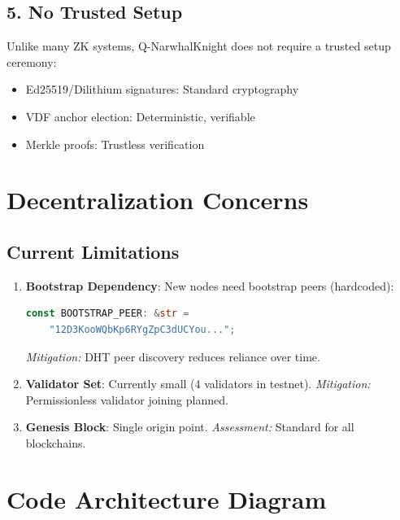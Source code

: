 \documentclass[a5paper,11pt]{article}
\begin{document}
\subsection{5. No Trusted Setup}

Unlike many ZK systems, Q-NarwhalKnight does not require a trusted setup ceremony:

\begin{itemize}
    \item Ed25519/Dilithium signatures: Standard cryptography
    \item VDF anchor election: Deterministic, verifiable
    \item Merkle proofs: Trustless verification
\end{itemize}

\section{Decentralization Concerns}

\subsection{Current Limitations}

\begin{enumerate}
    \item \textbf{Bootstrap Dependency}: New nodes need bootstrap peers (hardcoded):
    \begin{lstlisting}[language=Rust]
const BOOTSTRAP_PEER: &str =
    "12D3KooWQbKp6RYgZpC3dUCYou...";
    \end{lstlisting}
    \textit{Mitigation:} DHT peer discovery reduces reliance over time.

    \item \textbf{Validator Set}: Currently small (4 validators in testnet).
    \textit{Mitigation:} Permissionless validator joining planned.

    \item \textbf{Genesis Block}: Single origin point.
    \textit{Assessment:} Standard for all blockchains.
\end{enumerate}

\section{Code Architecture Diagram}
\end{document}
